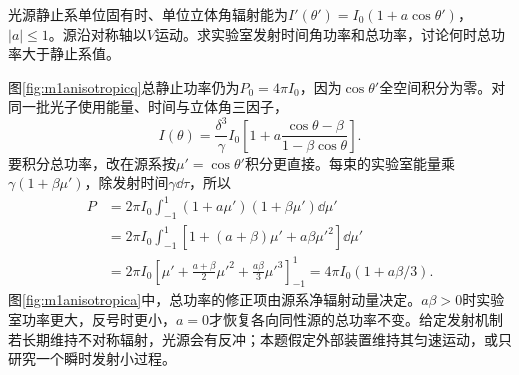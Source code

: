 \begin{exercise}\label{ex:m1anisotropicsource}
光源静止系单位固有时、单位立体角辐射能为$I'(\theta')=I_0(1+a\cos\theta')$，$|a|\leq1$。源沿对称轴以$V$运动。求实验室发射时间角功率和总功率，讨论何时总功率大于静止系值。
\end{exercise}
\begin{solution}
图\ref{fig:m1anisotropicq}总静止功率仍为$P_0=4\pi I_0$，因为$\cos\theta'$全空间积分为零。对同一批光子使用能量、时间与立体角三因子，
\[
 I(\theta)=\frac{\delta^3}{\gamma}I_0
 \left[1+a\frac{\cos\theta-\beta}{1-\beta\cos\theta}\right].
\]
要积分总功率，改在源系按$\mu'=\cos\theta'$积分更直接。每束的实验室能量乘$\gamma(1+\beta\mu')$，除发射时间$\gamma\dd\tau$，所以
\begin{align*}
 P&=2\pi I_0\int_{-1}^1(1+a\mu')(1+\beta\mu')\dd\mu'\\
 &=2\pi I_0\int_{-1}^1[1+(a+\beta)\mu'+a\beta\mu'^2]\dd\mu'\\
 &=2\pi I_0\left[\mu'+\frac{a+\beta}{2}\mu'^2+
 \frac{a\beta}{3}\mu'^3\right]_{-1}^{1}
 =4\pi I_0(1+a\beta/3).
\end{align*}
图\ref{fig:m1anisotropica}中，总功率的修正项由源系净辐射动量决定。$a\beta>0$时实验室功率更大，反号时更小，$a=0$才恢复各向同性源的总功率不变。给定发射机制若长期维持不对称辐射，光源会有反冲；本题假定外部装置维持其匀速运动，或只研究一个瞬时发射小过程。
\end{solution}

